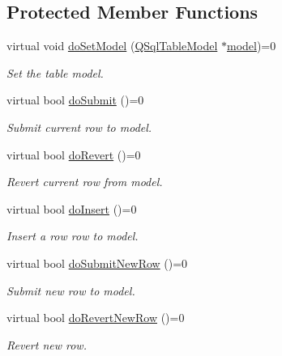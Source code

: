 \subsection*{Protected Member Functions}
\begin{DoxyCompactItemize}
\item 
virtual void \hyperlink{classmdt_abstract_sql_widget_aad8608a92f65790c99ca7897fbd48c30}{do\-Set\-Model} (\hyperlink{class_q_sql_table_model}{Q\-Sql\-Table\-Model} $\ast$\hyperlink{classmdt_abstract_sql_widget_a298d40a6540aeabbb7644e3c4fd9f3ea}{model})=0
\begin{DoxyCompactList}\small\item\em Set the table model. \end{DoxyCompactList}\item 
virtual bool \hyperlink{classmdt_abstract_sql_widget_a7a97e9c9f3b9c22650e4b55d095543ef}{do\-Submit} ()=0
\begin{DoxyCompactList}\small\item\em Submit current row to model. \end{DoxyCompactList}\item 
virtual bool \hyperlink{classmdt_abstract_sql_widget_a2c0cbbcd02be19767e68153ecbc2392d}{do\-Revert} ()=0
\begin{DoxyCompactList}\small\item\em Revert current row from model. \end{DoxyCompactList}\item 
virtual bool \hyperlink{classmdt_abstract_sql_widget_aa79059c092c6bcda569ced7c0621a817}{do\-Insert} ()=0
\begin{DoxyCompactList}\small\item\em Insert a row row to model. \end{DoxyCompactList}\item 
virtual bool \hyperlink{classmdt_abstract_sql_widget_ac546802e2910fc49c007eda5dbb3b3f7}{do\-Submit\-New\-Row} ()=0
\begin{DoxyCompactList}\small\item\em Submit new row to model. \end{DoxyCompactList}\item 
virtual bool \hyperlink{classmdt_abstract_sql_widget_a048efd5f89be7c6e74d6988b7e95fc07}{do\-Revert\-New\-Row} ()=0
\begin{DoxyCompactList}\small\item\em Revert new row. \end{DoxyCompactList}\item 

\end{DoxyCompactItemize}

